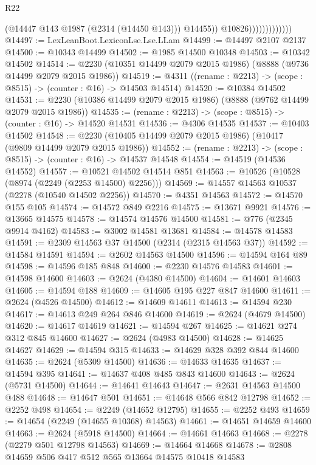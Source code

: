 \begin{lexlean}{R22}
\begin{coremodule}
                                  (@14447 @143 @1987 (@2314 (@14450 @143)))
                                  @14455))
                              @10826)))))))))))))
@14497 := LexLeanBoot.LexiconLse.Lse.LLam
@14499 := @14497 @2107 @2137
@14500 := @10343 @14499
@14502 := @1985 @14500 @10348
@14503 := @10342 @14502
@14514 := @2230 (@10351 @14499 @2079 @2015 @1986) (@8888 (@9736 @14499 @2079 @2015 @1986))
@14519 := @4311 ((rename : @2213) -> (scope : @8515) -> (counter : @16) -> @14503 @14514)
@14520 := @10384 @14502
@14531 := @2230 (@10386 @14499 @2079 @2015 @1986) (@8888 (@9762 @14499 @2079 @2015 @1986))
@14535 := (rename : @2213) -> (scope : @8515) -> (counter : @16) -> @14520 @14531
@14536 := @4306 @14535
@14537 := @10403 @14502
@14548 := @2230 (@10405 @14499 @2079 @2015 @1986) (@10417 (@9809 @14499 @2079 @2015 @1986))
@14552 := (rename : @2213) -> (scope : @8515) -> (counter : @16) -> @14537 @14548
@14554 := @14519 (@14536 @14552)
@14557 := @10521 @14502 @14514 @851
@14563 := @10526 (@10528 (@8974 (@2249 (@2253 @14500) @2256)))
@14569 := @14557 @14563 @10537 (@2278 (@10540 @14502 @2256))
@14570 := @4351 @14563
@14572 := @14570 @155 @105
@14574 := @14572 @849 @2216
@14575 := @13671 @9921
@14576 := @13665 @14575
@14578 := @14574 @14576 @14500
@14581 := @776 (@2345 @9914 @4162)
@14583 := @3002 @14581 @13681
@14584 := @14578 @14583
@14591 := @2309 @14563 @37 @14500 (@2314 (@2315 @14563 @37))
@14592 := @14584 @14591
@14594 := @2602 @14563 @14500
@14596 := @14594 @164 @89
@14598 := @14596 @185 @848
@14600 := @2230 @14576 @14583
@14601 := @14598 @14600
@14603 := @2624 (@4380 @14500)
@14604 := @14601 @14603
@14605 := @14594 @188
@14609 := @14605 @195 @227 @847 @14600
@14611 := @2624 (@4526 @14500)
@14612 := @14609 @14611
@14613 := @14594 @230
@14617 := @14613 @249 @264 @846 @14600
@14619 := @2624 (@4679 @14500)
@14620 := @14617 @14619
@14621 := @14594 @267
@14625 := @14621 @274 @312 @845 @14600
@14627 := @2624 (@4983 @14500)
@14628 := @14625 @14627
@14629 := @14594 @315
@14633 := @14629 @328 @392 @844 @14600
@14635 := @2624 (@5309 @14500)
@14636 := @14633 @14635
@14637 := @14594 @395
@14641 := @14637 @408 @485 @843 @14600
@14643 := @2624 (@5731 @14500)
@14644 := @14641 @14643
@14647 := @2631 @14563 @14500 @488
@14648 := @14647 @501
@14651 := @14648 @566 @842 @12798
@14652 := @2252 @498
@14654 := @2249 (@14652 @12795)
@14655 := @2252 @493
@14659 := @14654 (@2249 (@14655 @10368) @14563)
@14661 := @14651 @14659 @14600
@14663 := @2624 (@5918 @14500)
@14664 := @14661 @14663
@14668 := @2278 (@2279 @501 @12798 @14563)
@14669 := @14664 @14668
@14678 := @2808 @14659 @506 @417 @512 @565 @13664 @14575 @10418 @14583

\end{coremodule}
\end{lexlean}
